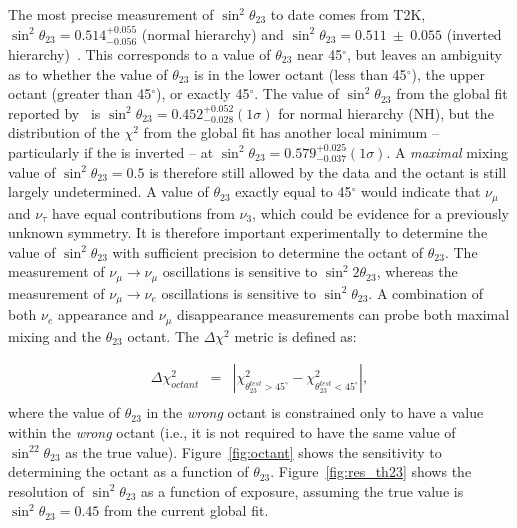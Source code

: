 The most precise measurement of $\sin^2\theta_{23}$ to date comes from T2K, $\sin^2\theta_{23} = 0.514^{+0.055}_{-0.056}$ (normal hierarchy) and $\sin^2\theta_{23} = 0.511~\pm~0.055$ (inverted hierarchy)~\cite{Abe:2015awa}. This corresponds to a value of $\theta_{23}$ near 45\mbox{$^{\circ}$}, but leaves an ambiguity as to whether the value of $\theta_{23}$ is in the lower octant (less than 45\mbox{$^{\circ}$}), the upper octant (greater than 45\mbox{$^{\circ}$}), or exactly 45\mbox{$^{\circ}$}.  The value of $\sin^2 \theta_{23}$ from the global fit reported by~\cite{Gonzalez-Garcia:2014bfa} is $\sin ^2 \theta_{23} = 0.452
^{+0.052} _{-0.028} (1 \sigma)$ for normal hierarchy (NH), but the distribution of the $\chi^2$ from the global fit has another local minimum -- particularly if the  is inverted -- at $\sin^2 \theta_{23} = 0.579 ^{+0.025} _{-0.037} (1 \sigma)$. A \emph{maximal} mixing value of $\sin^2 \theta_{23} =0.5$ is therefore still allowed by the data and the octant is still largely undetermined.  A value of
$\theta_{23}$ exactly equal to 45\mbox{$^{\circ}$} would indicate that $\nu_{\mu}$ and $\nu_{\tau}$ have equal contributions from $\nu_3$, which could be evidence for a previously unknown symmetry.  It is therefore important experimentally to determine the value of $\sin ^2
\theta_{23}$ with sufficient precision to determine the octant of $\theta_{23}$.  The measurement of $\nu_\mu \rightarrow \nu_\mu$ oscillations is sensitive to $\sin ^2 2 \theta_{23}$, whereas the measurement of $\nu_\mu \rightarrow \nu_e$ oscillations is sensitive to $\sin^2 \theta_{23}$.  A combination of both $\nu_e$ appearance and $\nu_\mu$ disappearance measurements can probe both maximal mixing and
the $\theta_{23}$ octant.  The $\Delta\chi^2$ metric is defined as:

\begin{eqnarray}
\Delta\chi^2_{octant} & = & |\chi^2_{\theta_{23}^{test}>45^\circ} - \chi^2_{\theta_{23}^{test}<45^\circ}|, \\ \nonumber
\end{eqnarray}
where the value of $\theta_{23}$ in the \emph{wrong} octant is constrained 
only to have a value within the \emph{wrong} octant (i.e., it is not required
to have the same value of $\sin^22\theta_{23}$ as the true value).
Figure~\ref{fig:octant} shows the sensitivity to determining the octant as a function of $\theta_{23}$.  Figure~\ref{fig:res_th23} shows the resolution of $\sin^2\theta_{23}$ as a function of exposure, assuming the true value is $\sin^2\theta_{23} = 0.45$ from the current global fit.

